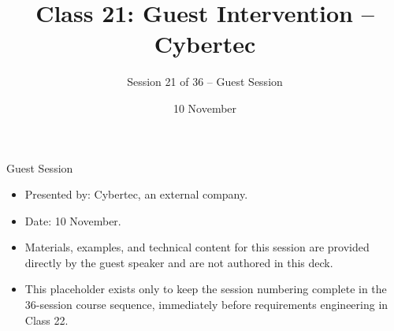 

\title{Class 21: Guest Intervention -- Cybertec}
\subtitle{Session 21 of 36 -- Guest Session}
\author{\coursename}
\date{10 November}



\frame{\titlepage \coursefooter}

\begin{frame}{Guest Session}
\begin{itemize}
\item Presented by: Cybertec, an external company.
\item Date: 10 November.
\item Materials, examples, and technical content for this session are provided directly by the guest speaker and are not authored in this deck.
\item This placeholder exists only to keep the session numbering complete in the 36-session course sequence, immediately before requirements engineering in Class 22.
\end{itemize}
\coursefooter
\end{frame}


